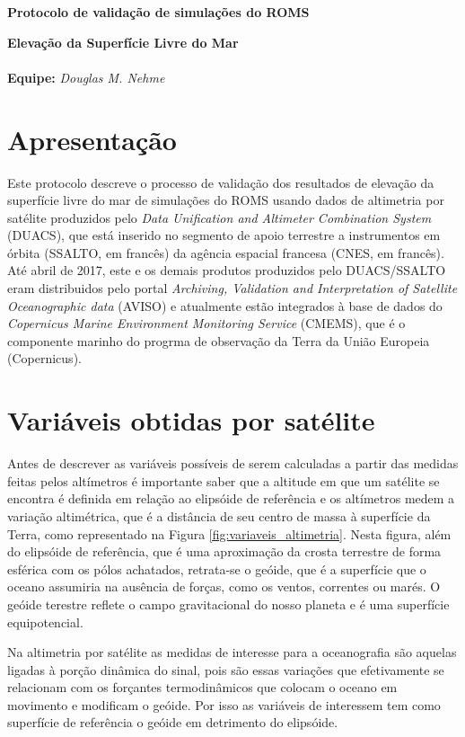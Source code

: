 \documentclass[12pt]{article}
\begin{document}
\begin{center}
	{\bf {\Large Protocolo de validação de simulações do ROMS}}
	\vspace{5mm}\par

	{\bf {\large Elevação da Superfície Livre do Mar}}
	\\
	\hrulefill
	\\
	
	{\bf Equipe:} {\it Douglas M. Nehme}\\
	\par
\end{center}

\tableofcontents

\newpage

\section*{Apresentação}
	\par Este protocolo descreve o processo de validação dos resultados de elevação da superfície livre do mar de simulações do ROMS usando dados de altimetria por satélite produzidos pelo \textit{Data Unification and Altimeter Combination System} (DUACS), que está inserido no segmento de apoio terrestre a instrumentos em órbita (SSALTO, em francês) da agência espacial francesa (CNES, em francês). Até abril de 2017, este e os demais produtos produzidos pelo DUACS/SSALTO eram distribuidos pelo portal \textit{Archiving, Validation and Interpretation of Satellite Oceanographic data} (AVISO) e atualmente estão integrados à base de dados do \textit{Copernicus Marine Environment Monitoring Service} (CMEMS), que é o componente marinho do progrma de observação da Terra da União Europeia (Copernicus).
	
\section{Variáveis obtidas por satélite}
	\label{sec:variaveis_satelitais}
	\par Antes de descrever as variáveis possíveis de serem calculadas a partir das medidas feitas pelos altímetros é importante saber que a altitude em que um satélite se encontra é definida em relação ao elipsóide de referência e os altímetros medem a variação altimétrica, que é a distância de seu centro de massa à superfície da Terra, como representado na Figura \ref{fig:variaveis_altimetria}. Nesta figura, além do elipsóide de referência, que é uma aproximação da crosta terrestre de forma esférica com os pólos achatados, retrata-se o geóide, que é a superfície que o oceano assumiria na ausência de forças, como os ventos, correntes ou marés. O geóide terestre reflete o campo gravitacional do nosso planeta e é uma superfície equipotencial.
	\par Na altimetria por satélite as medidas de interesse para a oceanografia são aquelas ligadas à porção dinâmica do sinal, pois são essas variações que efetivamente se relacionam com os forçantes termodinâmicos que colocam o oceano em movimento e modificam o geóide. Por isso as variáveis de interessem tem como superfície de referência o geóide em detrimento do elipsóide.
\end{document}
